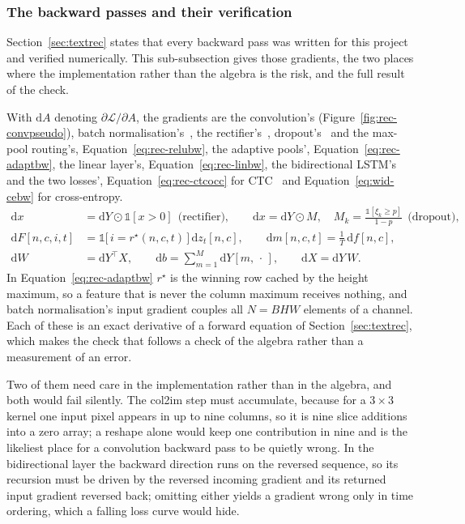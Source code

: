 \subsubsection{The backward passes and their verification}

Section~\ref{sec:textrec} states that every backward pass was written for this project and verified numerically.
This sub-subsection gives those gradients, the two places where the implementation rather than the algebra is the risk, and the full result of the check.

With $\mathrm dA$ denoting $\partial\mathcal L/\partial A$, the gradients are the convolution's (Figure~\ref{fig:rec-convpseudo}), batch normalisation's~\cite{ioffe2015}, the rectifier's~\cite{nair2010}, dropout's~\cite{srivastava2014} and the max-pool routing's, Equation~\ref{eq:rec-relubw}, the adaptive pools', Equation~\ref{eq:rec-adaptbw}, the linear layer's, Equation~\ref{eq:rec-linbw}, the bidirectional LSTM's~\cite{hochreiter1997} and the two losses', Equation~\ref{eq:rec-ctcocc} for CTC~\cite{graves2006} and Equation~\ref{eq:wid-cebw} for cross-entropy.
\begin{align}
\mathrm dx&=\mathrm dY\odot\mathbb 1[x>0]\ \ \text{(rectifier)},\qquad
\mathrm dx=\mathrm dY\odot M,\quad M_k=\frac{\mathbb 1[\xi_k\ge p]}{1-p}\ \ \text{(dropout)},\label{eq:rec-relubw}\\
\mathrm dF[n,c,i,t]&=\mathbb 1\bigl[\,i=r^{\star}(n,c,t)\,\bigr]\,\mathrm dz_t[n,c],\qquad
\mathrm dm[n,c,t]=\frac{1}{T}\,\mathrm df[n,c],\label{eq:rec-adaptbw}\\
\mathrm dW&=\mathrm dY^{\top}X,\qquad \mathrm db=\sum_{m=1}^{M}\mathrm dY[m,\,\cdot\,],\qquad \mathrm dX=\mathrm dY\,W.\label{eq:rec-linbw}
\end{align}
In Equation~\ref{eq:rec-adaptbw} $r^{\star}$ is the winning row cached by the height maximum, so a feature that is never the column maximum receives nothing, and batch normalisation's input gradient couples all $N=BHW$ elements of a channel.
Each of these is an exact derivative of a forward equation of Section~\ref{sec:textrec}, which makes the check that follows a check of the algebra rather than a measurement of an error.

Two of them need care in the implementation rather than in the algebra, and both would fail silently.
The col2im step must accumulate, because for a $3\times3$ kernel one input pixel appears in up to nine columns, so it is nine slice additions into a zero array; a reshape alone would keep one contribution in nine and is the likeliest place for a convolution backward pass to be quietly wrong.
In the bidirectional layer the backward direction runs on the reversed sequence, so its recursion must be driven by the reversed incoming gradient and its returned input gradient reversed back; omitting either yields a gradient wrong only in time ordering, which a falling loss curve would hide.

